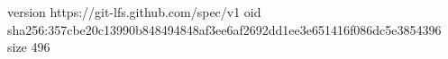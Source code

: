 version https://git-lfs.github.com/spec/v1
oid sha256:357cbe20c13990b848494848af3ee6af2692dd1ee3e651416f086dc5e3854396
size 496
